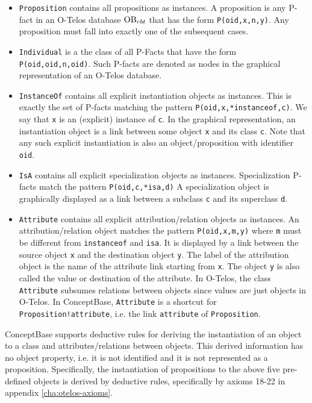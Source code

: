 \begin{itemize}

\item {\tt Proposition} contains all propositions as instances. A proposition
is any P-fact in an O-Telos database $\hbox{\rm OB}_{rbt}$
that has the form {\tt P(oid,x,n,y)}. Any proposition must fall into
exactly one of the subsequent cases.


\item {\tt Individual} is a the class of all P-Facts that have the form
{\tt P(oid,oid,n,oid)}. Such P-facts are denoted as nodes in the graphical
representation of an O-Telos database.

\item {\tt InstanceOf} contains all explicit instantiation objects as instances.
This is exactly the set of P-facts matching the pattern
{\tt P(oid,x,*instanceof,c)}. We say that {\tt x} is an (explicit)
instance of {\tt c}.
In the graphical representation, an instantiation object is a link
between some object {\tt x} and its class {\tt c}. Note that any such
explicit instantiation is also an object/proposition with identifier {\tt oid}.

\item {\tt IsA} contains all explicit specialization objects as instances.
Specialization P-facts match the pattern {\tt P(oid,c,*isa,d)}
A specialization object is graphically displayed as a link between
a subclass {\tt c} and its superclass {\tt d}.

\item {\tt Attribute} contains all explicit attribution/relation
objects as instances. An attribution/relation object matches the pattern
{\tt P(oid,x,m,y)} where {\tt m} must be different from 
{\tt *instanceof} and {\tt *isa}.
It is displayed by a link between the source object
{\tt x} and the destination object {\tt y}. The label of the attribution object
is the name of the attribute link starting from {\tt x}. The object
{\tt y} is also called the value or destination of the attribute.
In O-Telos, the class {\tt Attribute} subsumes relations between objects
since values are just objects in O-Telos. In ConceptBase, 
{\tt Attribute} is a shortcut for
{\tt Proposition!attribute}, i.e. the link {\tt attribute}
of {\tt Proposition}.

\end{itemize}

ConceptBase supports deductive rules for deriving the instantiation of an object to a class
and attributes/relations between objects. This derived information has no
object property, i.e. it is not identified and it is not represented as a
proposition. Specifically, the instantiation of propositions to the above
five pre-defined objects is derived by deductive rules, specifically by axioms 
18-22 in appendix \ref{cha:otelos-axioms}.

